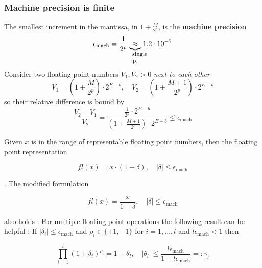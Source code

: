 \subsubsection{Machine precision is finite}
The smallest increment in the mantissa, in $1 + \frac{M}{2^p}$, is the \textbf{machine precision}
\begin{equation}
    \epsilon_{\text{mach}} = \frac{1}{2^p} \explain{\approx}{single p.} 1.2 \cdot 10^{-7}
\end{equation}
Consider two floating point numbers $V_1,V_2>0$ \textit{next to each other}
\begin{equation}
    V_1 = \left(1 + \frac{M}{2^p}\right) \cdot 2^{E - b}, \quad V_2 = \left(1 + \frac{M + 1}{2^p}\right) \cdot 2^{E - b}
\end{equation}
so their relative difference is bound by
\begin{equation}
    \frac{V_2 - V_1}{V_2} = \frac{\frac{1}{2^p} \cdot 2^{E - b}}{\left(1 + \frac{M + 1}{2^p}\right) \cdot 2^{E - b}} \leq \epsilon_{\text{mach}}
\end{equation}


Given $x$ is in the range of representable floating point numbers, then the floating point representation

\begin{equation}
    fl(x) = x \cdot (1+\delta), \quad |\delta| \leq \epsilon_{\text{mach}}
\end{equation}

\citep[Theorem 2.2]{higham02}. The modified formulation

\begin{equation}
    fl(x) = \frac{x}{1+\delta}, \quad |\delta| \leq \epsilon_{\text{mach}}
\end{equation}

also holds \citep[Theorem 2.2]{higham02}. For multiple floating point operations
the following result can be helpful \citep[Lemma 3.1]{higham02}: If $|\delta_i| \leq \epsilon_{\text{mach}}$
and $\rho_i \in \{+1,-1 \}$ for $i = 1,...,l$ and $l \epsilon_{\text{mach}} < 1$
then

\begin{equation}
    \label{eq:mult_float_bound}
    \prod_{i=1}^{l} (1+\delta_i)^{\rho_i} = 1 + \theta_l, \quad |\theta_l| \leq \frac{l \epsilon_{\text{mach}}}{1 - l \epsilon_{\text{mach}}} =: \gamma_l
\end{equation}

